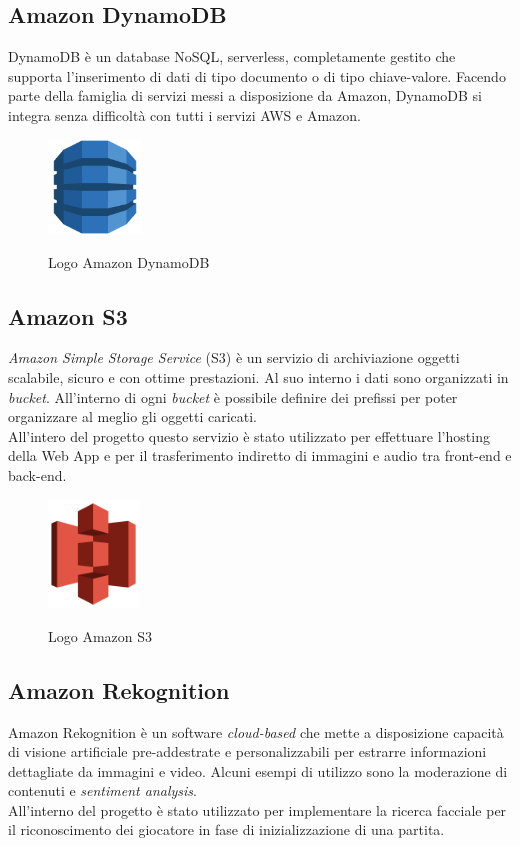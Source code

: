 	\subsection{Amazon DynamoDB}
	DynamoDB è un database \gls{NoSQL}, serverless, completamente gestito che supporta l'inserimento di dati di tipo documento o di tipo chiave-valore. Facendo parte della famiglia di servizi messi a disposizione da Amazon, DynamoDB si integra senza
	difficoltà con tutti i servizi \gls{AWS} e Amazon.
	
	\begin{figure}[H]
		\centering
		\includegraphics[width=2.5cm]{immagini/DynamoDB.png} \\
		\caption{\label{fig:logo_dynamoDB} Logo Amazon DynamoDB}
	\end{figure}
	
	\subsection{Amazon S3}
	\emph{Amazon Simple Storage Service} (S3) è un servizio di archiviazione oggetti scalabile, sicuro e con ottime prestazioni. Al suo interno i dati sono organizzati in \emph{bucket}. All'interno di ogni \emph{bucket} è possibile definire dei prefissi per poter organizzare al meglio gli oggetti caricati. \\
	All'intero del progetto questo servizio è stato utilizzato per effettuare l’hosting della Web App e per il trasferimento indiretto di immagini e audio tra front-end e back-end.
	
	\begin{figure}[H]
		\centering
		\includegraphics[width=2.4cm]{immagini/amazon-s3.png} \\
		\caption{\label{fig:logo_s3} Logo Amazon S3}
	\end{figure}

	
	\subsection{Amazon Rekognition}
	Amazon Rekognition è un software \emph{cloud-based} che mette a disposizione capacità di visione artificiale pre-addestrate e personalizzabili per estrarre informazioni dettagliate da immagini e video. Alcuni esempi di utilizzo sono la moderazione di contenuti e \emph{sentiment analysis}.\\ 
	All'interno del progetto è stato utilizzato per implementare la ricerca facciale per il riconoscimento dei giocatore in fase di inizializzazione di una partita.
	
